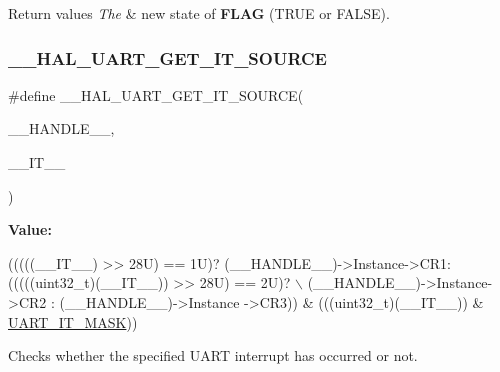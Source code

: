 \begin{DoxyRetVals}{Return values}
{\em The} & new state of {\bfseries F\+L\+AG} (T\+R\+UE or F\+A\+L\+SE). \\
\hline
\end{DoxyRetVals}
\mbox{\label{group___u_a_r_t___exported___macros_gab7ad503802bf56bf397c392fc8e18b77}} 
\subsubsection{\texorpdfstring{\+\_\+\+\_\+\+H\+A\+L\+\_\+\+U\+A\+R\+T\+\_\+\+G\+E\+T\+\_\+\+I\+T\+\_\+\+S\+O\+U\+R\+CE}{\_\_HAL\_UART\_GET\_IT\_SOURCE}}
{\footnotesize\ttfamily \#define \+\_\+\+\_\+\+H\+A\+L\+\_\+\+U\+A\+R\+T\+\_\+\+G\+E\+T\+\_\+\+I\+T\+\_\+\+S\+O\+U\+R\+CE(\begin{DoxyParamCaption}\item[{}]{\+\_\+\+\_\+\+H\+A\+N\+D\+L\+E\+\_\+\+\_\+,  }\item[{}]{\+\_\+\+\_\+\+I\+T\+\_\+\+\_\+ }\end{DoxyParamCaption})}

{\bfseries Value\+:}
\begin{DoxyCode}
(((((\_\_IT\_\_) >> 28U) == 1U)? (\_\_HANDLE\_\_)->Instance->CR1:(((((uint32\_t)(\_\_IT\_\_)) >> 28U) == 2U)? \(\backslash\)
                                                      (\_\_HANDLE\_\_)->Instance->CR2 : (\_\_HANDLE\_\_)->Instance
      ->CR3)) & (((uint32\_t)(\_\_IT\_\_)) & \mbox{\hyperlink{group___u_a_r_t___exported___macros_ga869439269c26e8dee93d49b1c7e67448}{UART\_IT\_MASK}}))
\end{DoxyCode}


Checks whether the specified U\+A\+RT interrupt has occurred or not. 


